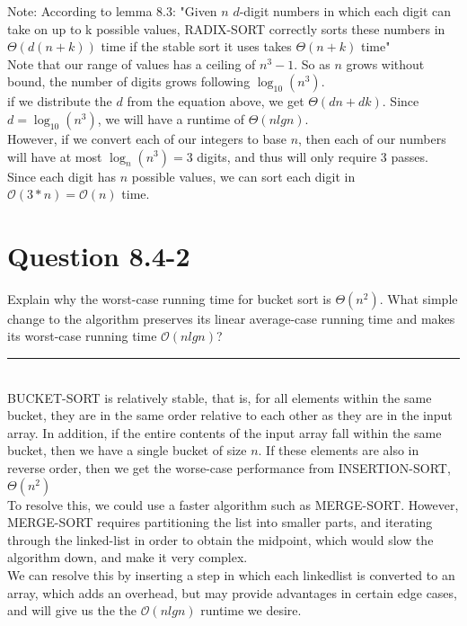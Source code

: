\documentclass[20pt]{article} %
\begin{document}
Note: According to lemma 8.3: "Given $n$ $d$-digit numbers in which each digit can take on up to k possible values, RADIX-SORT correctly sorts these numbers in $\Theta(d(n+k))$ time if the stable sort it uses takes $\Theta(n+k)$ time" \\

Note that our range of values has a ceiling of $n^{3}-1$.  So as $n$ grows without bound, the number of digits grows following $\log_{10} (n^{3})$. \\

if we distribute the $d$ from the equation above, we get $\Theta(dn+dk)$.  Since $d = \log_{10} (n^{3})$, we will have a runtime of $\Theta(nlgn)$. \\

However, if we convert each of our integers to base $n$, then each of our numbers will have at most $\log_{n}(n^{3}) = 3$ digits, and thus will only require 3 passes.  Since each digit has $n$ possible values, we can sort each digit in $\mathcal{O}(3*n) = \mathcal{O}(n)$ time.


\section{Question 8.4-2}
Explain why the worst-case running time for bucket sort is $\Theta(n^{2})$. What simple change to the algorithm preserves its linear average-case running time and makes its worst-case running time $\mathcal{O}(nlgn)$? \\ 
\noindent\rule{2cm}{0.4pt} \\ 

BUCKET-SORT is relatively stable, that is, for all elements within the same bucket, they are in the same order relative to each other as they are in the input array.  In addition, if the entire contents of the input array fall within the same bucket, then we have a single bucket of size $n$.  If these elements are also in reverse order, then we get the worse-case performance from INSERTION-SORT, $\Theta(n^{2})$ \\ 

To resolve this, we could use a faster algorithm such as MERGE-SORT.  However, MERGE-SORT requires partitioning the list into smaller parts, and iterating through the linked-list in order to obtain the midpoint, which would slow the algorithm down, and make it very complex.  \\ 

We can resolve this by inserting a step in which each linkedlist is converted to an array, which adds an overhead, but may provide advantages in certain edge cases, and will give us the the $\mathcal{O}(nlgn)$ runtime we desire.
\end{document}
